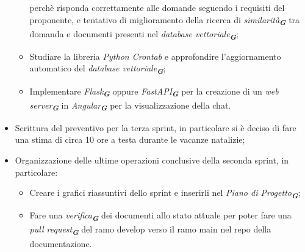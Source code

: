 \begin{itemize}
\begin{itemize}
        perchè risponda correttamente alle domande seguendo i requisiti del proponente, e tentativo di miglioramento della ricerca
        di \emph{similarità}\textsubscript{\textit{\textbf{G}}} tra domanda e documenti presenti nel \emph{database vettoriale}\textsubscript{\textit{\textbf{G}}};
        \item Studiare la libreria \emph{Python Crontab} e approfondire l'aggiornamento automatico del \emph{database vettoriale}\textsubscript{\textit{\textbf{G}}};
        \item Implementare \emph{Flask}\textsubscript{\textit{\textbf{G}}} oppure \emph{FastAPI}\textsubscript{\textit{\textbf{G}}} per la creazione di un 
        \emph{web server}\textsubscript{\textit{\textbf{G}}} in \emph{Angular}\textsubscript{\textit{\textbf{G}}} per la visualizzazione della chat.
    \end{itemize}
    \item Scrittura del preventivo per la terza sprint, in particolare si è deciso di fare una stima di circa 10 ore a testa durante
    le vacanze natalizie;
    \item Organizzazione delle ultime operazioni conclusive della seconda sprint, in particolare:
    \begin{itemize}
        \item Creare i grafici riassuntivi dello sprint e inserirli nel \emph{Piano di Progetto}\textsubscript{\textit{\textbf{G}}};
        \item Fare una \emph{verifica}\textsubscript{\textit{\textbf{G}}} dei documenti allo stato attuale per poter fare una \emph{pull request}\textsubscript{\textit{\textbf{G}}} del ramo develop verso il ramo main nel repo della documentazione.
    \end{itemize}
\end{itemize}
